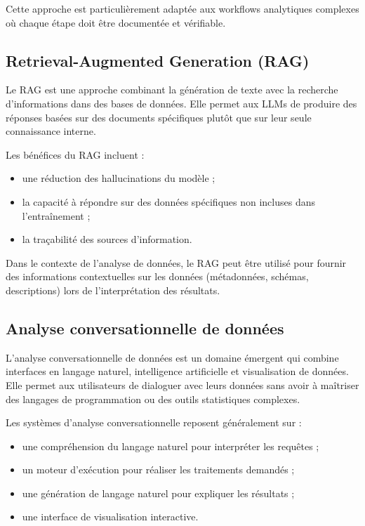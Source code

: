 Cette approche est particulièrement adaptée aux workflows analytiques complexes où chaque étape doit être documentée et vérifiable.



\subsection{Retrieval-Augmented Generation (RAG)}

Le RAG est une approche combinant la génération de texte avec la recherche d'informations dans des bases de données. Elle permet aux LLMs de produire des réponses basées sur des documents spécifiques plutôt que sur leur seule connaissance interne.

Les bénéfices du RAG incluent :

\begin{itemize}
  \item une réduction des hallucinations du modèle ;
  \item la capacité à répondre sur des données spécifiques non incluses dans l'entraînement ;
  \item la traçabilité des sources d'information.
\end{itemize}

Dans le contexte de l'analyse de données, le RAG peut être utilisé pour fournir des informations contextuelles sur les données (métadonnées, schémas, descriptions) lors de l'interprétation des résultats.

\subsection{Analyse conversationnelle de données}

L'analyse conversationnelle de données est un domaine émergent qui combine interfaces en langage naturel, intelligence artificielle et visualisation de données. Elle permet aux utilisateurs de dialoguer avec leurs données sans avoir à maîtriser des langages de programmation ou des outils statistiques complexes.

Les systèmes d'analyse conversationnelle reposent généralement sur :

\begin{itemize}
  \item une compréhension du langage naturel pour interpréter les requêtes ;
  \item un moteur d'exécution pour réaliser les traitements demandés ;
  \item une génération de langage naturel pour expliquer les résultats ;
  \item une interface de visualisation interactive.
\end{itemize}

